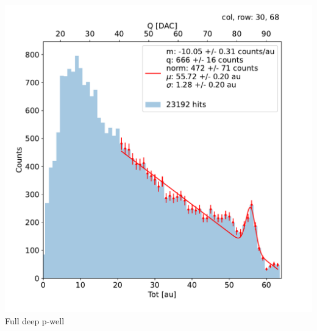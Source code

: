 \begin{frame}[noframenumbering]
\begin{columns}
                \includegraphics[width=1.\linewidth]{figures/charaterization/fit_line_gauss_r69.pdf}
                \centering Full deep p-well
        \end{columns}
    \end{frame}





